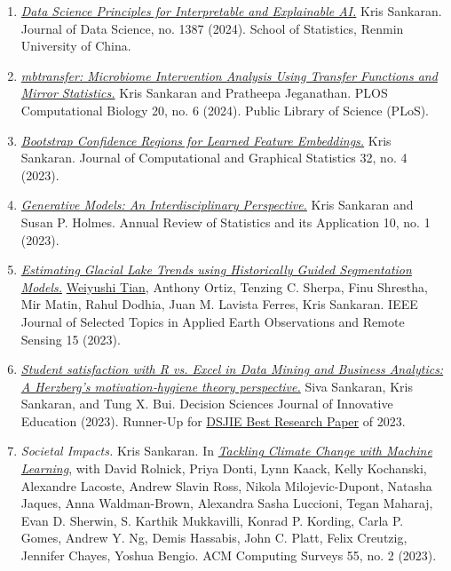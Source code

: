 \documentclass[letterpaper]{article}
\begin{document}
\begin{enumerate}
  \item \href{https://doi.org/10.6339/24-jds1150}{\textit{Data Science Principles for Interpretable and Explainable AI.}} Kris Sankaran. Journal of Data Science, no. 1387 (2024). School of Statistics, Renmin University of China.
  \item \href{https://doi.org/10.1371/journal.pcbi.1012196}{\textit{mbtransfer: Microbiome Intervention Analysis Using Transfer Functions and Mirror Statistics.}} Kris Sankaran and Pratheepa Jeganathan. PLOS Computational Biology 20, no. 6 (2024). Public Library of Science (PLoS).
  \item \href{https://doi.org/10.1080/10618600.2023.2197478}{\textit{Bootstrap Confidence Regions for Learned Feature Embeddings.}} Kris Sankaran. Journal of Computational and Graphical Statistics 32, no. 4 (2023).
  \item \href{https://doi.org/10.1146/annurev-statistics-033121-110134}{\textit{Generative Models: An Interdisciplinary Perspective.}} Kris Sankaran and Susan P. Holmes. Annual Review of Statistics and its Application 10, no. 1 (2023).
  \item \href{https://doi.org/10.1109/JSTARS.2022.3215722}{\textit{Estimating Glacial Lake Trends using Historically Guided Segmentation Models.}} \underline{Weiyushi Tian}, Anthony Ortiz, Tenzing C. Sherpa, Finu Shrestha, Mir Matin, Rahul Dodhia, Juan M. Lavista Ferres, Kris Sankaran. IEEE Journal of Selected Topics in Applied Earth Observations and Remote Sensing 15 (2023).
  \item \href{ https://doi.org/10.1111/dsji.12285}{\textit{Student satisfaction with R vs. Excel in Data Mining and Business Analytics: A Herzberg's motivation‐hygiene theory perspective.}} Siva Sankaran, Kris Sankaran, and Tung X. Bui. Decision Sciences Journal of Innovative Education (2023). Runner-Up for \href{https://onlinelibrary.wiley.com/pb-assets/assets/15404609/DSJIE-2023-Awards-1700644906877.pdf}{DSJIE Best Research Paper} of 2023.
  \item \textit{Societal Impacts.} Kris Sankaran. In \href{https://dl.acm.org/doi/10.1145/3485128}{\textit{Tackling Climate Change with Machine Learning}}, with David Rolnick, Priya Donti, Lynn Kaack, Kelly Kochanski, Alexandre Lacoste, Andrew Slavin Ross, Nikola Milojevic-Dupont, Natasha Jaques, Anna Waldman-Brown, Alexandra Sasha Luccioni, Tegan Maharaj, Evan D. Sherwin, S. Karthik Mukkavilli, Konrad P. Kording, Carla P. Gomes, Andrew Y. Ng, Demis Hassabis, John C. Platt, Felix Creutzig, Jennifer Chayes, Yoshua Bengio. ACM Computing Surveys 55, no. 2 (2023).

\end{enumerate}
\end{document}
